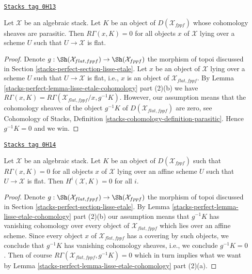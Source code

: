 \begin{lemma}
\label{stacks-perfect-lemma-cohomology-parasitic}
\href{https://stacks.math.columbia.edu/tag/0H13}{\texttt{Stacks tag 0H13}}

Let $\mathcal{X}$ be an algebraic stack. Let $K$ be an object of
$D(\mathcal{X}_{fppf})$ whose cohomology sheaves are parasitic. Then
$R\Gamma(x, K) = 0$ for all objects $x$ of $\mathcal{X}$ lying
over a scheme $U$ such that $U \to \mathcal{X}$ is flat.
\end{lemma}

\begin{proof}
Denote $g : \Sh(\mathcal{X}_{flat, fppf}) \to \Sh(\mathcal{X}_{fppf})$
the morphism of topoi discussed in Section \ref{stacks-perfect-section-lisse-etale}.
Let $x$ be an object of $\mathcal{X}$ lying over a scheme $U$
such that $U \to \mathcal{X}$ is flat, i.e., $x$ is an object
of $\mathcal{X}_{flat, fppf}$.
By Lemma \ref{stacks-perfect-lemma-lisse-etale-cohomology} part (2)(b) we have
$R\Gamma(x, K) = R\Gamma(\mathcal{X}_{flat, fppf}/x, g^{-1}K)$.
However, our assumption means that the cohomology sheaves
of the object $g^{-1}K$ of $D(\mathcal{X}_{flat, fppf})$ are zero, see
Cohomology of Stacks, Definition \ref{stacks-cohomology-definition-parasitic}.
Hence $g^{-1}K = 0$ and we win.
\end{proof}

\begin{lemma}
\label{stacks-perfect-lemma-cohomology-parasitic-complex}
\href{https://stacks.math.columbia.edu/tag/0H14}{\texttt{Stacks tag 0H14}}

Let $\mathcal{X}$ be an algebraic stack. Let $K$ be an object of
$D(\mathcal{X}_{fppf})$ such that $R\Gamma(x, K) = 0$ for all objects
$x$ of $\mathcal{X}$ lying over an affine scheme $U$ such that
$U \to \mathcal{X}$ is flat. Then $H^i(\mathcal{X}, K) = 0$ for all $i$.
\end{lemma}

\begin{proof}
Denote $g : \Sh(\mathcal{X}_{flat, fppf}) \to \Sh(\mathcal{X}_{fppf})$
the morphism of topoi discussed in Section \ref{stacks-perfect-section-lisse-etale}.
By Lemma \ref{stacks-perfect-lemma-lisse-etale-cohomology} part (2)(b) our assumption
means that $g^{-1}K$ has vanishing cohomology over every object
of $\mathcal{X}_{flat, fppf}$ which lies over an affine scheme.
Since every object $x$ of $\mathcal{X}_{flat, fppf}$ has a covering
by such objects, we conclude that $g^{-1}K$ has vanishing cohomology
sheaves, i.e., we conclude $g^{-1}K = 0$. Then of course
$R\Gamma(\mathcal{X}_{flat, fppf}, g^{-1}K) = 0$ which in turn implies
what we want by Lemma \ref{stacks-perfect-lemma-lisse-etale-cohomology} part (2)(a).
\end{proof}

